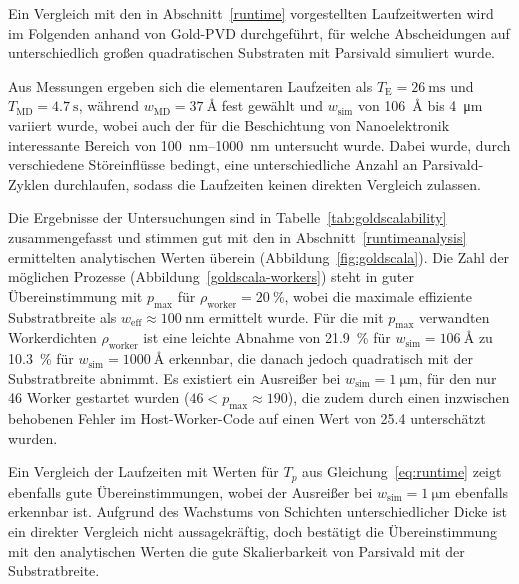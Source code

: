Ein Vergleich mit den in Abschnitt~\ref{runtime} vorgestellten Laufzeitwerten wird im Folgenden anhand von Gold-PVD durchgeführt, für welche Abscheidungen auf unterschiedlich großen quadratischen Substraten mit Parsivald simuliert wurde.

Aus Messungen ergeben sich die elementaren Laufzeiten als $T_\text{E} = \SI{26}{\milli\second}$ und $T_\text{MD} = \SI{4.7}{\second}$, während $w_\text{MD} = \SI{37}{\angstrom}$ fest gewählt und $w_\text{sim}$ von \SI{106}{\angstrom} bis \SI{4}{\micro\meter} variiert wurde, wobei auch der für die Beschichtung von Nanoelektronik interessante Bereich von \SIrange{100}{1000}{\nano\meter} untersucht wurde.
Dabei wurde, durch verschiedene Störeinflüsse bedingt, eine unterschiedliche Anzahl an Parsivald-Zyklen durchlaufen, sodass die Laufzeiten keinen direkten Vergleich zulassen.

Die Ergebnisse der Untersuchungen sind in Tabelle~\ref{tab:goldscalability} zusammengefasst und stimmen gut mit den in Abschnitt~\ref{runtimeanalysis} ermittelten analytischen Werten überein (Abbildung~\ref{fig:goldscala}).
Die Zahl der möglichen Prozesse (Abbildung~\ref{goldscala-workers}) steht in guter Übereinstimmung mit $p_\text{max}$ für $\rho_\text{worker} = \SI{20}{\percent}$, wobei die maximale effiziente Substratbreite als $w_\text{eff} \approx \SI{100}{\nano\meter}$ ermittelt wurde.
Für die mit $p_\text{max}$ verwandten Workerdichten $\rho_\text{worker}$ ist eine leichte Abnahme von \SI{21.9}{\percent} für $w_\text{sim} = \SI{106}{\angstrom}$ zu \SI{10.3}{\percent} für $w_\text{sim} = \SI{1000}{\angstrom}$ erkennbar, die danach jedoch quadratisch mit der Substratbreite abnimmt.
Es existiert ein Ausreißer bei $w_\text{sim} = \SI{1}{\micro\meter}$, für den nur 46 Worker gestartet wurden ($\num{46} < p_\text{max} \approx \num{190}$), die zudem durch einen inzwischen behobenen Fehler im Host-Worker-Code auf einen Wert von \num{25.4} unterschätzt wurden.

Ein Vergleich der Laufzeiten mit Werten für $T_p$ aus Gleichung~\ref{eq:runtime} zeigt ebenfalls gute Übereinstimmungen, wobei der Ausreißer bei $w_\text{sim} = \SI{1}{\micro\meter}$ ebenfalls erkennbar ist.
Aufgrund des Wachstums von Schichten unterschiedlicher Dicke ist ein direkter Vergleich nicht aussagekräftig, doch bestätigt die Übereinstimmung mit den analytischen Werten die gute Skalierbarkeit von Parsivald mit der Substratbreite.

